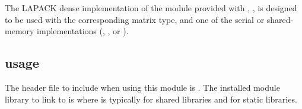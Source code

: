 
The LAPACK dense implementation of the {\sunlinsol} module provided
with {\sundials}, {\sunlinsollapdense}, is designed to be used with the 
corresponding {\sunmatdense} matrix type, and one of the serial or
shared-memory {\nvector} implementations ({\nvecs}, {\nvecopenmp}, or
{\nvecpthreads}).

\subsection{{\sunlinsollapdense} usage}\label{ss:sunlinsol_lapdense_usage}

The header file to include when using this module 
is . The installed module
library to link to is
where  is typically  for shared libraries and
 for static libraries.

